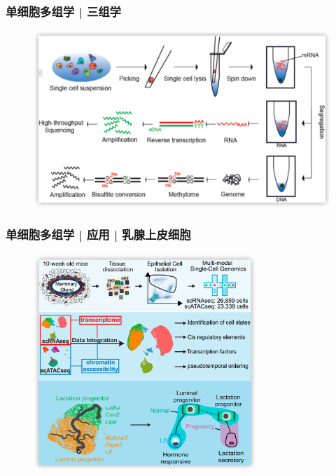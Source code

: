 \documentclass[11pt]{ctexbeamer}
\begin{document}
\begin{frame}
	\frametitle{单细胞多组学 | 三组学}
		\begin{figure}
		\includegraphics[width=\textwidth]{scTrio-seq.png}
	\end{figure}
\end{frame}

\begin{frame}
	\frametitle{单细胞多组学 | 应用 | 乳腺上皮细胞}
	\begin{figure}
		\includegraphics[width=0.75\textwidth]{omics_example_05.png}
	\end{figure}
\end{frame}
\end{document}
